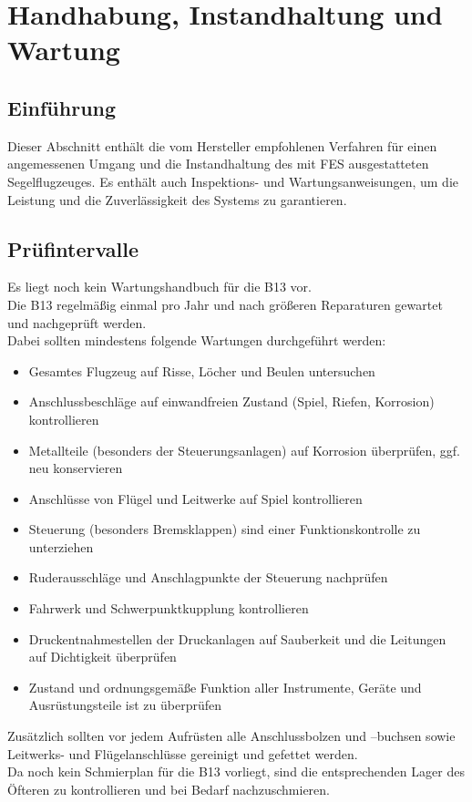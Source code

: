 \chapter{ Handhabung, Instandhaltung und Wartung}
\section{Einführung}
Dieser Abschnitt enthält die vom Hersteller empfohlenen Verfahren für einen angemessenen Umgang und die Instandhaltung des mit FES ausgestatteten Segelflugzeuges. Es enthält auch Inspektions- und Wartungsanweisungen, um die Leistung und die Zuverlässigkeit des Systems zu garantieren.

\section{Prüfintervalle}
Es liegt noch kein Wartungshandbuch für die B13 vor. \\
\newline
Die B13 regelmäßig einmal pro Jahr und nach größeren Reparaturen gewartet und nachgeprüft werden. \\
\newline
Dabei sollten mindestens folgende Wartungen durchgeführt werden:
\begin{itemize}
\item Gesamtes Flugzeug auf Risse, Löcher und Beulen untersuchen
\item Anschlussbeschläge auf einwandfreien Zustand (Spiel, Riefen, Korrosion) kontrollieren 
\item Metallteile (besonders der Steuerungsanlagen) auf Korrosion überprüfen, ggf. neu konservieren
\item Anschlüsse von Flügel und Leitwerke auf Spiel kontrollieren
\item Steuerung (besonders Bremsklappen) sind einer Funktionskontrolle zu unterziehen
\item Ruderausschläge und Anschlagpunkte der Steuerung nachprüfen
\item Fahrwerk und Schwerpunktkupplung kontrollieren 
\item Druckentnahmestellen der Druckanlagen auf Sauberkeit und die Leitungen auf Dichtigkeit überprüfen
\item Zustand und ordnungsgemäße Funktion aller Instrumente, Geräte und Ausrüstungsteile ist zu überprüfen
\end{itemize}

Zusätzlich sollten vor jedem Aufrüsten alle Anschlussbolzen und –buchsen sowie Leitwerks- und Flügelanschlüsse gereinigt und gefettet werden. \\
\newline
Da noch kein Schmierplan für die B13 vorliegt, sind die entsprechenden Lager des Öfteren zu kontrollieren und bei Bedarf nachzuschmieren. \\

